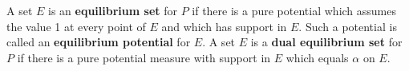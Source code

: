 A set $E$ is an \textbf{equilibrium set} for $P$ if there is a pure potential which assumes the value 1 at every point of $E$ and which has support in $E$. Such a potential is called an \textbf{equilibrium potential} for $E$. A set $E$ is a \textbf{dual equilibrium set} for $P$ if there is a pure potential measure with support in $E$ which equals $\alpha$ on $E$.